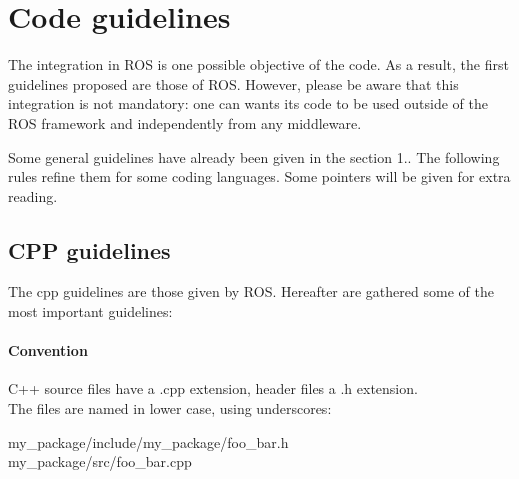 

\pagebreak
\section{Code guidelines}


The integration in ROS is one possible objective of the code.
As a result,  the first guidelines proposed are those of ROS.
However, please be aware that this integration is not mandatory: one can wants its code to be used outside of the ROS framework and independently from any middleware.



Some general guidelines have already been given in the section 1..
The following rules refine them for some coding languages.
Some pointers will be given for extra reading.


\subsection{CPP guidelines}

The cpp guidelines are those given by ROS.
Hereafter are gathered some of the most important guidelines:

\paragraph{Convention}
C++ source files have a .cpp extension, header files a .h extension.\\
The files are named in lower case, using underscores:\\
\begin{tt}
my\_package/include/my\_package/foo\_bar.h\\
my\_package/src/foo\_bar.cpp\\
\end{tt}

